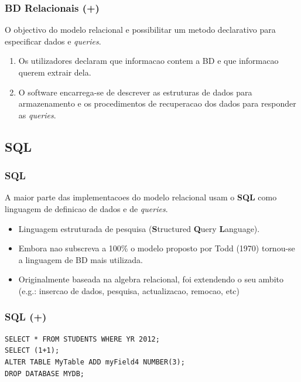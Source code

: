 \documentclass[hyperref={pdfpagelabels=true}]{beamer}
\begin{document}
\begin{frame}
\frametitle{BD Relacionais (+)}
O objectivo do modelo relacional e possibilitar um metodo declarativo para especificar dados e \textit{queries}.
  \begin{enumerate}
  \item<2-> Os utilizadores declaram que informacao contem a BD e que informacao querem extrair dela.
  \item<3-> O software encarrega-se de descrever as estruturas de dados para armazenamento e os procedimentos de recuperacao dos dados para responder as \textit{queries}.
  \end{enumerate}
\end{frame}

\subsection{SQL}
\begin{frame}
\frametitle{SQL}
A maior parte das implementacoes do modelo relacional usam o \textbf{SQL} como linguagem de definicao de dados e de \textit{queries}.
  \begin{itemize}
  \item<2-> Linguagem estruturada de pesquisa (\textbf{S}tructured \textbf{Q}uery \textbf{L}anguage).
  \item<3-> Embora nao subscreva a 100\% o modelo proposto por Todd (1970) tornou-se a linguagem de BD mais utilizada.
  \item<4-> Originalmente baseada na algebra relacional, foi extendendo o seu ambito (e.g.: insercao de dados, pesquisa, actualizacao, remocao, etc)
  \end{itemize}
\end{frame}

\begin{frame}[fragile]
\frametitle{SQL (+)}
\lstset{language=SQL}
\begin{lstlisting}
SELECT * FROM STUDENTS WHERE YR 2012;
SELECT (1+1);
ALTER TABLE MyTable ADD myField4 NUMBER(3);
DROP DATABASE MYDB; 
\end{lstlisting}
\end{frame}
\end{document}

